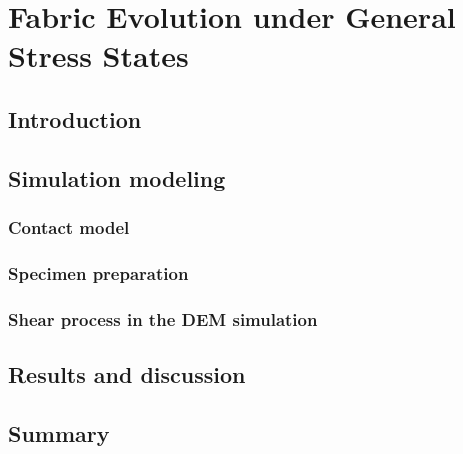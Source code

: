 \documentclass[../main]{subfiles}
\begin{document}
\chapter{Fabric Evolution under General Stress States}
\label{ch:fabric_evolution}

\section{Introduction}
\label{sec:ch3_intro}

\section{Simulation modeling}
\label{sec:ch3_modeling}

\subsection{Contact model}
\label{subsec:ch3_contact}

\subsection{Specimen preparation}
\label{subsec:ch3_specimen}

\subsection{Shear process in the DEM simulation}
\label{subsec:ch3_shear}

\section{Results and discussion}
\label{sec:ch3_results}


\section{Summary}
\label{sec:ch3_summary}
\end{document}
